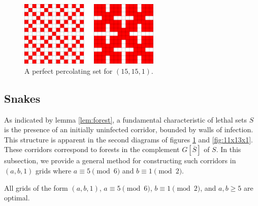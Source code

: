 \begin{figure}[]
\centering
\includegraphics[width=0.6\textwidth]{figures/4/15x15x1.pdf}
\caption{A perfect percolating set for $(15,15,1)$.}
\label{fig:15x15x1}
\end{figure} 

\subsection{Snakes}

As indicated by lemma \ref{lem:forest}, a fundamental characteristic of lethal sets $S$ is the presence of an initially uninfected corridor, bounded by walls of infection. This structure is apparent in the second diagrams of figures \ref{fig:15x15x1} and \ref{fig:11x13x1}. These corridors correspond to forests in the complement $G[\overline{S}]$ of $S$. In this subsection, we provide a general method for constructing such corridors in $(a, b, 1)$ grids where $a \equiv 5 \pmod 6$ and $b \equiv 1 \pmod 2$.

\begin{con}
\label{con:snake}
All grids of the form $(a,b,1)$, $a \equiv 5 \pmod 6$, $b \equiv 1 \pmod 2$, and $a,b \geq 5$ are optimal.
\end{con}

